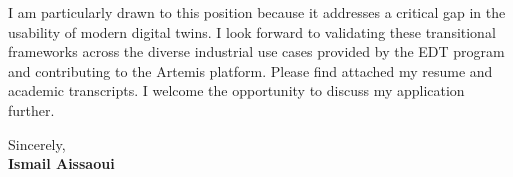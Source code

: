 \documentclass[11pt,a4paper]{article}
\begin{document}
\vspace{0.5em}
\noindent
I am particularly drawn to this position because it addresses a critical gap in the usability of modern digital twins. I look forward to validating these transitional frameworks across the diverse industrial use cases provided by the EDT program and contributing to the Artemis platform. Please find attached my resume and academic transcripts. I welcome the opportunity to discuss my application further.

\vspace{1.5em}
\noindent
Sincerely, \\[0.5em]
\textbf{Ismail Aissaoui}
\end{document}
